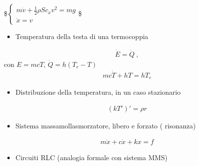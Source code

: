 \documentclass[letterpaper,10pt,english]{jupyterBook}
\begin{document}
\sphinxAtStartPar
{}
\$\(\begin{cases}
m \dot{v} + \frac{1}{2} \rho S c_x v^2 = mg \\
\dot{x} = v
\end{cases}\)\$
\begin{itemize}
\item {} 
\sphinxAtStartPar
Temperatura della testa di una termocoppia

\end{itemize}
\begin{equation*}
\begin{split}\dot{E} = \dot{Q} \ ,\end{split}
\end{equation*}
\sphinxAtStartPar
con \(E = m c T\), \(\dot{Q} = h (T_e - T)\)
\begin{equation*}
\begin{split}m c \dot{T} + h T = h T_e\end{split}
\end{equation*}\begin{itemize}
\item {} 
\sphinxAtStartPar
Distribuzione della temperatura, in un caso stazionario

\end{itemize}
\begin{equation*}
\begin{split}(k T')' = \rho r\end{split}
\end{equation*}\begin{itemize}
\item {} 
\sphinxAtStartPar
Sistema massa\sphinxhyphen{}molla\sphinxhyphen{}smorzatore, libero e forzato ( risonanza)

\end{itemize}
\begin{equation*}
\begin{split}m \ddot{x} + c \dot{x} + k x = f\end{split}
\end{equation*}\begin{itemize}
\item {} 
\sphinxAtStartPar
Circuiti RLC (analogia formale con sistema MMS)

\end{itemize}
\end{document}
